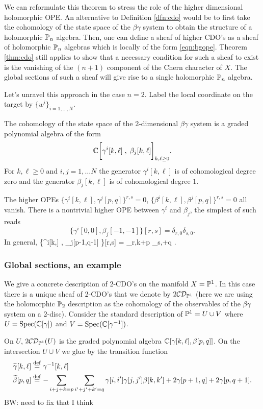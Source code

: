 \documentclass[11pt]{amsart}
\def\CDO{{\cC\cD}}
\def\brian#1{{\textcolor{blue!65!red}{BW: {#1}}}}
\begin{document}
We can reformulate this theorem to stress the role of the higher dimensional holomorphic OPE. 
An alternative to Definition \ref{dfn:cdo} would be to first take the cohomology of the state space of the $\beta\gamma$ system to obtain the structure of a holomorphic $\mathbb P_n$ algebra.
Then, one can define a sheaf of higher CDO's as a sheaf of holomorphic $\mathbb P_n$ algebras which is locally of the form \eqref{eqn:bgope}. 
Theorem \ref{thm:cdo} still applies to show that a necessary condition for such a sheaf to exist is the vanishing of the $(n+1)$ component of the Chern character of $X$. 
The global sections of such a sheaf will give rise to a single holomorphic $\mathbb P_n$ algebra. 


Let's unravel this approach in the case $n=2$. 
Label the local coordinate on the target by $\{w^i\}_{i=1,\ldots,N}$. 

The cohomology of the state space of the $2$-dimensional $\beta\gamma$ system is a graded polynomial algebra of the form
\[
\mathbb C\bigg[\gamma^i[k,\ell] \; , \; \beta_j [k,\ell] \bigg]_{k,\ell \geq 0} .
\]
For $k,\ell \geq 0$ and $i,j=1,\ldots N$ the generator $\gamma^i[k,\ell]$ is of cohomological degree zero and the generator $\beta_j[k,\ell]$ is of cohomological degree $1$.

The higher OPEs $\{\gamma^i[k,\ell], \gamma^j [p,q]\}^{r,s} = 0$, $\{\beta^i[k,\ell], \beta^j [p,q]\}^{r,s} = 0$ all vanish. 
There is a nontrivial higher OPE between $\gamma^i$ and $\beta_j$, the simplest of such reads
\[
\big\{\gamma^i[0,0] , \beta_j[-1,-1] \big\}[r,s] = \delta_{r,0} \delta_{s,0} .
\]
In general, 
\beqn\label{eqn:bgope}
\big\{\gamma^i[k,\ell] , \beta_j[p-1,q-1] \big\}[r,s] = \delta_{r,k+p} \delta_{s,\ell+q} .
\eeqn

\subsubsection{Global sections, an example}

We give a concrete description of 2-CDO's on the manifold $X = \mathbb P^1$.
In this case there is a unique sheaf of 2-CDO's that we denote by $2\CDO_{\PP^1}$ (here we are using the holomorphic $\mathbb P_2$ description as the cohomology of the observables of the $\beta\gamma$ system on a $2$-disc).
Consider the standard description of $\mathbb P^1 = U \cup V$ where $U = {\rm Spec}(\mathbb C[\gamma])$ and $V = {\rm Spec}(\mathbb C[\gamma^{-1}])$. 

On $U$, $2\CDO_{\PP^1}(U)$ is the graded polynomial algebra $\mathbb C[\gamma[k,\ell], \beta[p,q]]$. 
On the intersection $U \cup V$ we glue by the transition function
\begin{align*}
\widetilde{\gamma} [k,\ell] & \overset{\rm def}{=} \gamma^{-1} [k,\ell] \\
\widetilde{\beta} [p,q] & \overset{\rm def}{=} - \sum_{i+j+k=p} \sum_{i'+j'+k'=q} \gamma[i,i'] \gamma[j,j'] \beta[k,k'] + 2 \gamma[p+1, q] + 2 \gamma[p, q+1] .
\end{align*}
\brian{need to fix that I think}
\end{document}
